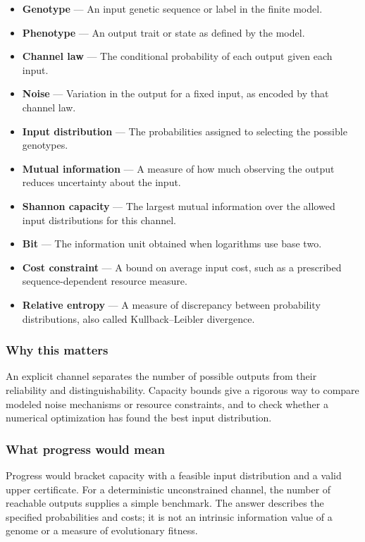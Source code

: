\documentclass[
  11pt,
]{article}
\begin{document}
\begin{itemize}
\item
  \textbf{Genotype} --- An input genetic sequence or label in the finite
  model.
\item
  \textbf{Phenotype} --- An output trait or state as defined by the
  model.
\item
  \textbf{Channel law} --- The conditional probability of each output
  given each input.
\item
  \textbf{Noise} --- Variation in the output for a fixed input, as
  encoded by that channel law.
\item
  \textbf{Input distribution} --- The probabilities assigned to
  selecting the possible genotypes.
\item
  \textbf{Mutual information} --- A measure of how much observing the
  output reduces uncertainty about the input.
\item
  \textbf{Shannon capacity} --- The largest mutual information over the
  allowed input distributions for this channel.
\item
  \textbf{Bit} --- The information unit obtained when logarithms use
  base two.
\item
  \textbf{Cost constraint} --- A bound on average input cost, such as a
  prescribed sequence-dependent resource measure.
\item
  \textbf{Relative entropy} --- A measure of discrepancy between
  probability distributions, also called Kullback--Leibler divergence.
\end{itemize}

\subsubsection{Why this matters}

An explicit channel separates the number of possible outputs from their
reliability and distinguishability. Capacity bounds give a rigorous way
to compare modeled noise mechanisms or resource constraints, and to
check whether a numerical optimization has found the best input
distribution.

\subsubsection{What progress would mean}

Progress would bracket capacity with a feasible input distribution and a
valid upper certificate. For a deterministic unconstrained channel, the
number of reachable outputs supplies a simple benchmark. The answer
describes the specified probabilities and costs; it is not an intrinsic
information value of a genome or a measure of evolutionary fitness.
\end{document}
